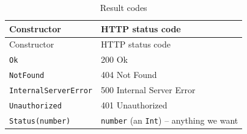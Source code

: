 \documentclass[oneside,11pt,a4paper,]{book}
\begin{document}
\begin{longtable}[c]{@{}ll@{}}
\caption{Result codes}\tabularnewline
\toprule
\begin{minipage}[b]{0.37\columnwidth}\raggedright\strut
Constructor
\strut\end{minipage} &
\begin{minipage}[b]{0.51\columnwidth}\raggedright\strut
HTTP status code
\strut\end{minipage}\tabularnewline
\midrule
\endfirsthead
\toprule
\begin{minipage}[b]{0.37\columnwidth}\raggedright\strut
Constructor
\strut\end{minipage} &
\begin{minipage}[b]{0.51\columnwidth}\raggedright\strut
HTTP status code
\strut\end{minipage}\tabularnewline
\midrule
\endhead
\begin{minipage}[t]{0.37\columnwidth}\raggedright\strut
\texttt{Ok}
\strut\end{minipage} &
\begin{minipage}[t]{0.51\columnwidth}\raggedright\strut
200 Ok
\strut\end{minipage}\tabularnewline
\begin{minipage}[t]{0.37\columnwidth}\raggedright\strut
\texttt{NotFound}
\strut\end{minipage} &
\begin{minipage}[t]{0.51\columnwidth}\raggedright\strut
404 Not Found
\strut\end{minipage}\tabularnewline
\begin{minipage}[t]{0.37\columnwidth}\raggedright\strut
\texttt{InternalServerError}
\strut\end{minipage} &
\begin{minipage}[t]{0.51\columnwidth}\raggedright\strut
500 Internal Server Error
\strut\end{minipage}\tabularnewline
\begin{minipage}[t]{0.37\columnwidth}\raggedright\strut
\texttt{Unauthorized}
\strut\end{minipage} &
\begin{minipage}[t]{0.51\columnwidth}\raggedright\strut
401 Unauthorized
\strut\end{minipage}\tabularnewline
\begin{minipage}[t]{0.37\columnwidth}\raggedright\strut
\texttt{Status(number)}
\strut\end{minipage} &
\begin{minipage}[t]{0.51\columnwidth}\raggedright\strut
\texttt{number} (an \texttt{Int}) -- anything we want
\strut\end{minipage}\tabularnewline
\bottomrule
\end{longtable}
\end{document}
